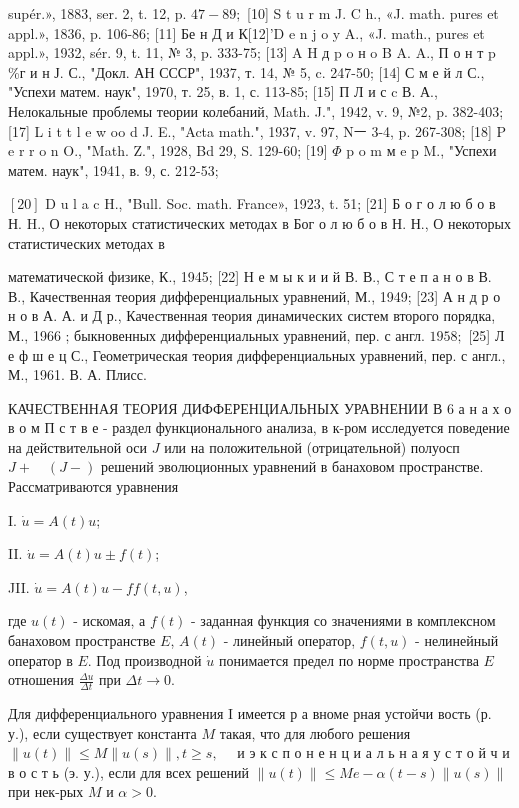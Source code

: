 \documentclass[10pt]{article}
\begin{document}
supér.», 1883, ser. 2, t. 12, p. $47-89 ;$ [10] S t u r m J. C h., «J. math. pures et appl.», 1836, p. 106-86; [11] Бе н Д и К[12]'D e n j o y A., «J. math., pures et appl.», 1932, sér. 9, t. 11, № 3, p. 333-75; [13] A H д p o н o B A. A., П о н т p \%г и н Ј. С., "Докл. АН СССР", 1937, т. 14, № 5, c. 247-50; [14] С м е й л С., "Успехи матем. наук", 1970, т. 25, в. 1, с. 113-85; [15] П Л и с c В. А., Нелокальные проблемы теории колебаний, Math. J.", 1942, v. 9, №2, p. 382-403; [17] L i t t l e w oo d J. E., "Acta math.", 1937, v. 97, Nㅡ 3-4, p. 267-308; [18] P e r r o n O., "Math. Z.", 1928, Bd 29, S. 129-60; [19] $\Phi$ p o m м e p M., "Успехи матем. наук", 1941, в. 9, с. 212-53;

$[20]$ D u l a c H., "Bull. Soc. math. France», 1923, t. 51; [21] Б о г о л ю б о в Н. H., О некоторых статистических методах в Бог о л ю б о в Н. Н., О некоторых статистических методах в

математической физике, К., 1945; [22] Н е м ы к и и й В. В., С т е п а н о в В. В., Качественная теория дифференциальных уравнений, М., 1949; [23] А н д р о н о в А. А. и Д р., Качественная теория динамических систем второго порядка, М., 1966 ; быкновенных дифференциальных уравнений, пер. с англ. $1958 ;$ [25] Л е ф ш е ц С., Геометрическая теория дифференциальных уравнений, пер. с англ., М., 1961. В. А. Плисс.



КАЧЕСТВЕННАЯ ТЕОРИЯ ДИФФЕРЕНЦИАЛЬНЫХ УРАВНЕНИИ В 6 а н а х о в $о$ м П с т в е - раздел функционального анализа, в к-ром исследуется поведение на действительной оси $J$ или на положительной (отрицательной) полуосп $J+\quad(J-)$ решений эволюционных уравнений в банаховом пространстве. Рассматриваются уравнения

I. $\dot{u}=A(t) u$;

II. $\dot{u}=A(t) u \pm f(t)$;

JII. $\dot{u}=A(t) u-f f(t, u)$,



где $u(t)$ - искомая, а $f(t)$ - заданная функция со значениями в комплексном банаховом пространстве $E$, $A(t)$ - линейный оператор, $f(t, u)$ - нелинейный оператор в $E$. Под производной $\dot{u}$ понимается предел по норме пространства $E$ отношения $\frac{\Delta u}{\Delta t}$ при $\Delta t \rightarrow 0$.



Для дифференциального уравнения I имеется р а вноме рная устойчи вость (р. у.), если существует константа $M$ такая, что для любого решения $\|u(t)\| \leqslant M\|u(s)\|, t \geqslant s, \quad$ и э к с п о н е н ц и а л ь н а я у с т о й ч и в о с т ь (э. у.), если для всех решений $\|u(t)\| \leqslant M e-\alpha(t-s)\|u(s)\|$ при нек-рых $M$ и $\alpha>0$.
\end{document}
